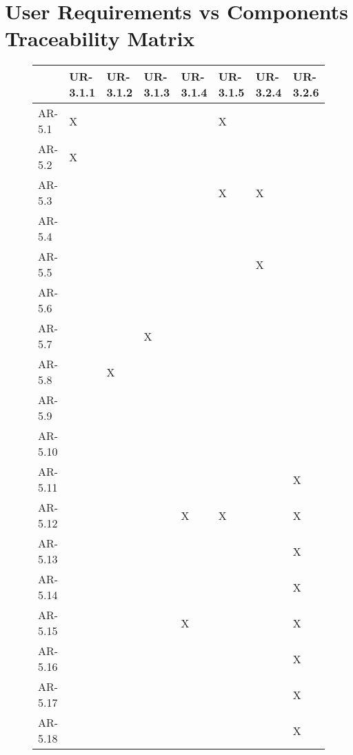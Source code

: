 \section{User Requirements vs Components Traceability Matrix}
\label{sec:user_req}

\begin{figure}[H]
\centering
\begin{tabular}{ | l | l | l | l | l | l | l | l |}
  \hline
    & UR-3.1.1 & UR-3.1.2 & UR-3.1.3 & UR-3.1.4 & UR-3.1.5 & UR-3.2.4 & UR-3.2.6\\ \hline
   AR-5.1 & X &  &  &  & X &  & \\ \hline
   AR-5.2 & X &  &  &  &  &  &  \\ \hline
   AR-5.3 &  &  &  &  & X & X &  \\ \hline
   AR-5.4 &  &  &  &  &  &  &  \\ \hline
   AR-5.5 &  &  &  &  &  & X &  \\ \hline
   AR-5.6 &  &  &  &  &  &  &  \\ \hline
   AR-5.7 &  &  & X &  &  &  &  \\ \hline
   AR-5.8 &  & X &  &  &  &  &  \\ \hline
   AR-5.9 &  &  &  &  &  &  &  \\ \hline
   AR-5.10 &  &  &  &  &  &  &  \\ \hline
   AR-5.11 &  &  &  &  &  &  & X \\ \hline
   AR-5.12 & &  &  & X & X &  & X \\ \hline
   AR-5.13 &  &  &  &  &  &  & X \\ \hline
   AR-5.14 &  &  &  &  &  &  & X \\ \hline
   AR-5.15 &  &  &  & X &  &  & X \\ \hline
   AR-5.16 &  &  &  &   &  &  & X \\ \hline
   AR-5.17 &  &  &  &  &  &  & X \\ \hline
   AR-5.18 &  &  &  &  &  &  & X \\ \hline
\end{tabular}
\end{figure}